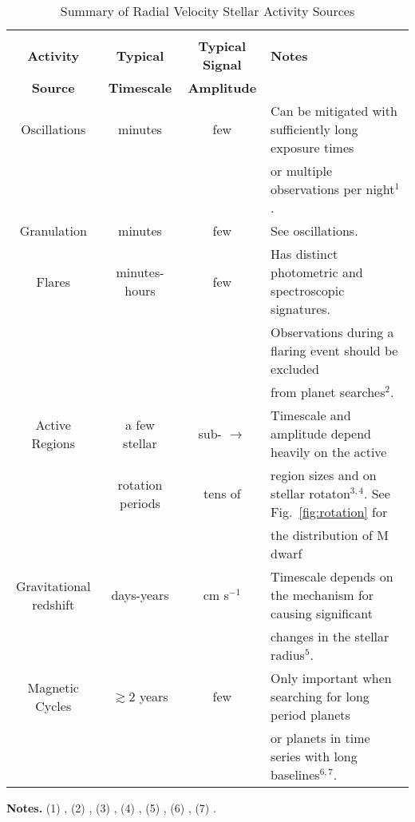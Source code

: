 \begin{table*}
\small
\renewcommand{\arraystretch}{0.7}
\caption{Summary of Radial Velocity Stellar Activity Sources}
\label{table:activity}
\begin{tabular}{cccl}
  \hline \\ [-1ex]
  \textbf{Activity} & \textbf{Typical} & \textbf{Typical Signal} & \textbf{Notes} \\
  \textbf{Source} & \textbf{Timescale} & \textbf{Amplitude} & \\
  \hline
  Oscillations & minutes & few \mps{} & Can be mitigated with sufficiently long exposure times \\
  &&&or multiple observations per night$^1$. \\
  \hline
  Granulation & minutes & few \mps{} & See oscillations.  \\
  \hline
  Flares & minutes-hours & few \mps{} & Has distinct photometric and spectroscopic signatures. \\ 
  &&&Observations during a flaring event should be excluded \\
  &&& from planet searches$^2$. \\
  \hline
  Active Regions & a few stellar & sub-\mps{} $\to$ & Timescale and amplitude depend heavily on the active \\
  & rotation periods & tens of \mps{} & region sizes and on stellar rotaton$^{3,4}$. See Fig.~\ref{fig:rotation} for \\
  &&& the distribution of M dwarf \prot{.} \\
  \hline
  Gravitational redshift & days-years & cm s$^{-1}$ & Timescale depends on the mechanism for causing significant \\
  &&& changes in the stellar radius$^5$. \\
  \hline
  Magnetic Cycles & $\gtrsim 2$ years & few \mps{} & Only important when searching for long period planets \\
  &&& or planets in time series with long baselines$^{6,7}$.
\end{tabular}
\begin{list}{}{}
\item {\bf{Notes.}}
      (1) \cite{dumusque11a}, (2) \cite{reiners09}, (3) \cite{dumusque11b}, (4) \cite{giles17},
 	(5) \cite{cegla12}, (6) \cite{santos10}, (7) \cite{robertson14}. \\
\end{list}
\end{table*}
